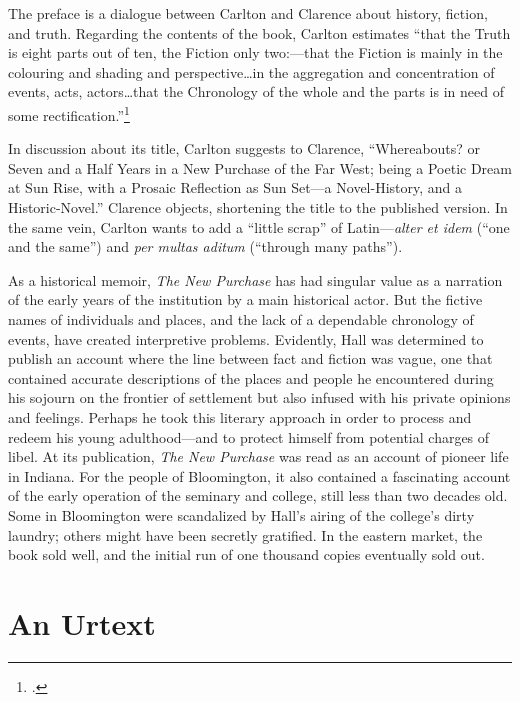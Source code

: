\documentclass[
  american,
  letterpaper,
]{scrreprt}
\begin{document}
The preface is a dialogue between Carlton and Clarence about history,
fiction, and truth. Regarding the contents of the book, Carlton
estimates ``that the Truth is eight parts out of ten, the Fiction only
two:---that the Fiction is mainly in the colouring and shading and
perspective\ldots in the aggregation and concentration of events, acts,
actors\ldots that the Chronology of the whole and the parts is in need
of some rectification.''\footnote{.}

In discussion about its title, Carlton suggests to Clarence,
``Whereabouts? or Seven and a Half Years in a New Purchase of the Far
West; being a Poetic Dream at Sun Rise, with a Prosaic Reflection as Sun
Set---a Novel-History, and a Historic-Novel.'' Clarence objects,
shortening the title to the published version. In the same vein, Carlton
wants to add a ``little scrap'' of Latin---\emph{alter et idem} (``one
and the same'') and \emph{per multas aditum} (``through many paths'').

As a historical memoir, \emph{The New Purchase} has had singular value
as a narration of the early years of the institution by a main
historical actor. But the fictive names of individuals and places, and
the lack of a dependable chronology of events, have created interpretive
problems. Evidently, Hall was determined to publish an account where the
line between fact and fiction was vague, one that contained accurate
descriptions of the places and people he encountered during his sojourn
on the frontier of settlement but also infused with his private opinions
and feelings. Perhaps he took this literary approach in order to process
and redeem his young adulthood---and to protect himself from potential
charges of libel. At its publication, \emph{The New Purchase} was read
as an account of pioneer life in Indiana. For the people of Bloomington,
it also contained a fascinating account of the early operation of the
seminary and college, still less than two decades old. Some in
Bloomington were scandalized by Hall's airing of the college's dirty
laundry; others might have been secretly gratified. In the eastern
market, the book sold well, and the initial run of one thousand copies
eventually sold out.

\section{An Urtext}\label{an-urtext}
\end{document}
